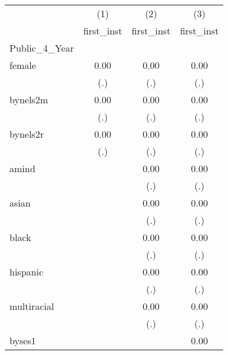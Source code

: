 {
\def\sym#1{\ifmmode^{#1}\else\(^{#1}\)\fi}
\begin{tabular}{l*{3}{c}}
\hline\hline
            &\multicolumn{1}{c}{(1)}&\multicolumn{1}{c}{(2)}&\multicolumn{1}{c}{(3)}\\
            &\multicolumn{1}{c}{first\_inst}&\multicolumn{1}{c}{first\_inst}&\multicolumn{1}{c}{first\_inst}\\
\hline
Public\_4\_Year&                     &                     &                     \\
female      &        0.00         &        0.00         &        0.00         \\
            &         (.)         &         (.)         &         (.)         \\
[1em]
bynels2m    &        0.00         &        0.00         &        0.00         \\
            &         (.)         &         (.)         &         (.)         \\
[1em]
bynels2r    &        0.00         &        0.00         &        0.00         \\
            &         (.)         &         (.)         &         (.)         \\
[1em]
amind       &                     &        0.00         &        0.00         \\
            &                     &         (.)         &         (.)         \\
[1em]
asian       &                     &        0.00         &        0.00         \\
            &                     &         (.)         &         (.)         \\
[1em]
black       &                     &        0.00         &        0.00         \\
            &                     &         (.)         &         (.)         \\
[1em]
hispanic    &                     &        0.00         &        0.00         \\
            &                     &         (.)         &         (.)         \\
[1em]
multiracial &                     &        0.00         &        0.00         \\
            &                     &         (.)         &         (.)         \\
[1em]
byses1      &                     &                     &        0.00         \\

\end{tabular}}
